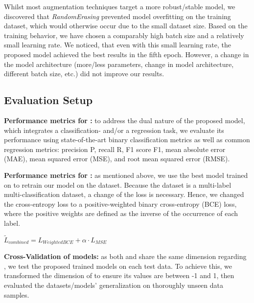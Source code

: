 Whilst most augmentation techniques target a more robust/stable model, we discovered that \textit{RandomErasing} prevented model overfitting on the training dataset, which would otherwise occur due to the small dataset size. Based on the training behavior, we have chosen a comparably high batch size and a relatively small learning rate. We noticed, that even with this small learning rate, the proposed model achieved the best results in the fifth epoch. However, a change in the model architecture (more/less parameters, change in model architecture, different batch size, etc.) did not improve our results.

\subsection{Evaluation Setup}

\textbf{Performance metrics for \affectnet{}:} to address the dual nature of the proposed model, which integrates a classification- and/or a regression task, we evaluate its performance using state-of-the-art binary classification metrics as well as common regression metrics: precision P, recall R, F1 score F1, mean absolute error (MAE), mean squared error (MSE), and root mean squared error (RMSE).

\textbf{Performance metrics for \emotic{}:} as mentioned above, we use the best model trained on \affectnet{} to retrain our model on the \emotic{} dataset. Because the \emotic{} dataset is a multi-label multi-classification dataset, a change of the loss is necessary. Hence, we changed the cross-entropy loss to a positive-weighted binary cross-entropy (BCE) loss, where the positive weights are defined as the inverse of the occurrence of each label.

\begin{center}
\begin{math}
\tilde{L}_{combined} = L_{WeightedBCE} + \alpha \cdot L_{MSE}
\end{math}
\end{center}

\textbf{Cross-Validation of models:} as both \emotic{} and \affectnet{} share the same dimension regarding \va{}, we test the proposed trained models on each test data. To achieve this, we transformed the dimension of \va{} to ensure its values are between -1 and 1, then evaluated the datasets/models' generalization on thoroughly unseen data samples.

